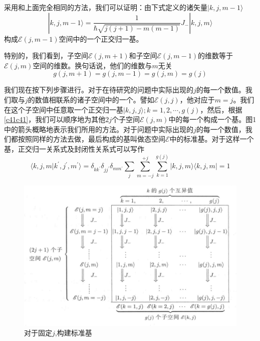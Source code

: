 \documentclass[]{article}
\begin{document}
采用和上面完全相同的方法，我们可以证明：由下式定义的诸矢量$|k,j,m-1\rangle$
\begin{equation}
	|k,j,m-1\rangle=\dfrac{1}{\hbar\sqrt{j(j+1)-m(m-1)}}J_-|k,j,m\rangle
	\label{c41c41}
\end{equation}
构成$\mathscr{E}(j,m-1)$空间中的一个正交归一基。\par 
特别的，我们看到，子空间$\mathscr{E}(j,m+1)$和子空间$\mathscr{E}(j,m-1)$的维数等于$\mathscr{E}(j,m)$空间的维数。换句话说，他们的维数与$m$无关
\begin{equation}
	g(j,m+1)=g(j,m-1)=g(j,m)=g(j)
\end{equation}

我们现在按下列步骤进行。对于在待研究的问题中实际出现的$j$的每一个数值。我们取与$j$的数值相联系的诸子空间中的一个。譬如$\mathscr{E}(j,j)$，他对应于$m=j$。我们在这个子空间中任意取一个正交归一基${|k,j,j\rangle;k=1,2,\cdots,g(j)}$，然后，根据\eqref{c41c41}，我们可以顺序地为其他$2j$个子空间$\mathscr{E}(j,m)$中的每一个构成一个基。图1中的箭头概略地表示我们所用的方法。对于问题中实际出现的$j$的每一个数值，我们都按照同样的方法去做，最后构成的基叫做态空间$\mathscr{E}$中的标准基。对于这样一个基，正交归一关系式及封闭性关系式可以写作
\begin{subequations}
	\begin{equation}
		\langle k,j,m|k^\prime,j^\prime,m^\prime\rangle=\delta_{kk^\prime}\delta_{jj^\prime}\delta_{mm^\prime}
	\end{equation}
	\begin{equation}
		\sum\limits_{j}\sum\limits_{m=-j}^{+j}\sum\limits_{k=1}^{g(j)}|k,j,m\rangle\langle k,j,m|=1
	\end{equation}
\end{subequations}
\begin{figure}[H]
	\centering
	\includegraphics[scale=0.2]{1.png}
	\caption{对于固定$j$,构建标准基}
	\label{Figure 1}
\end{figure}
\end{document}
